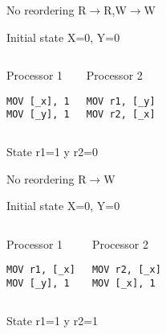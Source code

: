 \begin{frame}[t,fragile]{No reordering R$\rightarrow$R,W$\rightarrow$W}

\begin{block}{Initial state}
X=0, Y=0
\end{block}


\begin{columns}[T]


\begin{block}{Processor 1}
\begin{lstlisting}[language={[x86masm]Assembler}]
MOV [_x], 1
MOV [_y], 1
\end{lstlisting}
\end{block}

\begin{block}{Processor 2}
\begin{lstlisting}[language={[x86masm]Assembler}]
MOV r1, [_y]
MOV r2, [_x]
\end{lstlisting}
\end{block}

\end{columns}


\begin{block}{State }
r1=1 y r2=0
\end{block}

\end{frame}


\begin{frame}[t,fragile]{No reordering R$\rightarrow$W}

\begin{block}{Initial state}
X=0, Y=0
\end{block}


\begin{columns}[T]


\begin{block}{Processor 1}
\begin{lstlisting}[language={[x86masm]Assembler}]
MOV r1, [_x]
MOV [_y], 1
\end{lstlisting}
\end{block}

\begin{block}{Processor 2}
\begin{lstlisting}[language={[x86masm]Assembler}]
MOV r2, [_x]
MOV [_x], 1
\end{lstlisting}
\end{block}

\end{columns}


\begin{block}{State }
r1=1 y r2=1
\end{block}

\end{frame}

